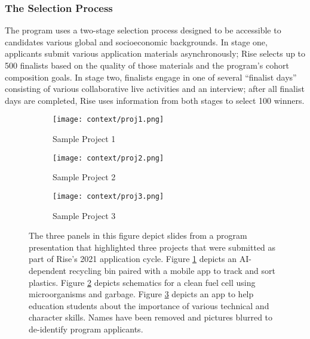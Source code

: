 \subsubsection{The Selection Process}
The program uses a two-stage selection process designed to be accessible to candidates various global and socioeconomic backgrounds. In stage one, applicants submit various application materials asynchronously; Rise selects up to 500 finalists based on the quality of those materials and the program's cohort composition goals. In stage two, finalists engage in one of several ``finalist days'' consisting of various collaborative live activities and an interview; after all finalist days are completed, Rise uses information from both stages to select 100 winners.

\begin{figure}[htbp]
    \centering
    \begin{subfigure}{.45\textwidth}
        \centering
        \texttt{[image: context/proj1.png]}
        \caption{Sample Project 1}
        \label{sfig:can}
    \end{subfigure}
    \hfill
    \vspace{1em}
    \begin{subfigure}{.45\textwidth}
        \centering
        \texttt{[image: context/proj2.png]}
        \caption{Sample Project 2}
        \label{sfig:cell}
    \end{subfigure}
    \hfill
    \vspace{1em}
    \begin{subfigure}{.45\textwidth}
        \centering
        \texttt{[image: context/proj3.png]} 
        \caption{Sample Project 3}
        \label{sfig:app}
    \end{subfigure}
    \caption{The three panels in this figure depict slides from a program presentation that highlighted three projects that were submitted as part of Rise's 2021 application cycle. Figure \ref{sfig:can} depicts an AI-dependent recycling bin paired with a mobile app to track and sort plastics. Figure \ref{sfig:cell} depicts schematics for a clean fuel cell using microorganisms and garbage. Figure \ref{sfig:app} depicts an app to help education students about the importance of various technical and character skills. Names have been removed and pictures blurred to de-identify program applicants.}
    \label{fig:example_projects}
\end{figure}

